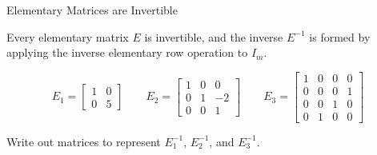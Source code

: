 \documentclass[xcolor=dvipsnames,aspectratio=169,t]{beamer}
\begin{document}
\begin{frame}{Elementary Matrices are Invertible}

  Every elementary matrix $E$ is invertible, and the inverse $E^{-1}$ is formed by applying the inverse elementary row operation to $I_m$.

  \[ 
    E_1 =  \begin{bmatrix} 1 & 0 \\ 0 & 5 \end{bmatrix}  \qquad
    E_2 =  \begin{bmatrix} 1 & 0  & 0 \\ 0 & 1 & -2 \\ 0 & 0 & 1 \end{bmatrix}  \qquad
    E_3 =  \begin{bmatrix} 1 & 0  & 0 & 0 \\ 0 & 0 & 0 & 1 \\ 0 & 0 & 1 & 0 \\ 0 & 1 & 0 & 0 \end{bmatrix}
  \]

  \bbox
    Write out matrices to represent  $E_1^{-1}$, $E^{-1}_2$, and $E^{-1}_3$.
  \ebox
\end{frame}
\end{document}
